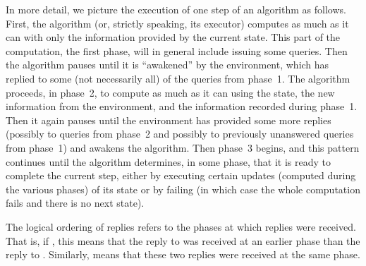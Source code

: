 \documentclass{LMCS}
\theoremstyle{definition}
\begin{document}
In more detail, we picture the execution of one step of an algorithm
as follows.  First, the algorithm (or, strictly speaking, its
executor) computes as much as it can with only the information
provided by the current state.  This part of the computation, the
first phase, will in general include issuing some queries.  Then the
algorithm pauses until it is ``awakened'' by the environment, which
has replied to some (not necessarily all) of the queries from phase~1.
The algorithm proceeds, in phase~2, to compute as much as it can using
the state, the new information from the environment, and
the information recorded during phase~1.  Then it again pauses
until the environment has provided some more replies (possibly to
queries from phase~2 and possibly to previously unanswered queries
from phase~1) and awakens the algorithm.  Then phase~3 begins, and
this pattern continues until the algorithm determines, in some
phase, that it is ready to complete the current step, either by
executing certain updates (computed during the various phases) of
its state or by failing (in which case the whole computation fails
and there is no next state).

The logical ordering of replies refers to the phases at which replies
were received.  That is, if , this means that the reply
 to  was received at an earlier phase than the reply
 to .  Similarly,  means that these two
replies were received at the same phase.
\end{document}
